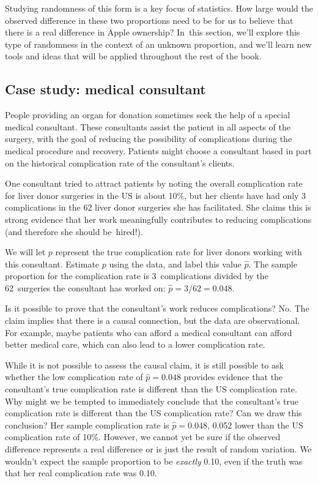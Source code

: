Studying randomness of this form is a key focus of statistics. How large would the observed difference in these two proportions need to be for us to believe that there is a real difference in Apple ownership? In~this section, we'll explore this type of randomness in the context of an unknown proportion, and we'll learn new tools and ideas that will be applied throughout the rest of the book.

\subsection{Case study: medical consultant}

People providing an organ for donation sometimes seek the help of a special medical consultant. These consultants assist the patient in all aspects of the surgery, with the goal of reducing the possibility of complications during the medical procedure and recovery. Patients might choose a consultant based in part on the historical complication rate of the consultant's clients.

One consultant tried to attract patients by noting the overall complication rate for liver donor surgeries in the US is about 10\%, but her clients have had only 3 complications in the 62 liver donor surgeries she has facilitated. She claims this is strong evidence that her work meaningfully contributes to reducing complications (and therefore she should be~hired!).

\begin{example}{We will let $p$ represent the true complication rate for liver donors working with this consultant. Estimate $p$ using the data, and label this value $\hat{p}$.}
The sample proportion for the complication rate is 3~complications divided by the 62~surgeries the consultant has worked on: $\hat{p} = 3/62 = 0.048$.
\end{example}

\begin{example}{Is it possible to prove that the consultant's work reduces complications?}
No. The claim implies that there is a causal connection, but the data are observational. For example, maybe patients who can afford a medical consultant can afford better medical care, which can also lead to a lower complication rate.
\end{example}

\begin{example}{While it is not possible to assess the causal claim, it is still possible to ask whether the low complication rate of $\hat{p} = 0.048$ provides evidence that the consultant's true complication rate is different than the US complication rate. Why might we be tempted to immediately conclude that the consultant's true complication rate is different than the US complication rate? Can we draw this conclusion?}
Her sample complication rate is $\hat{p} = 0.048$, 0.052 lower than the US complication rate of 10\%. However, we cannot yet be sure if the observed difference represents a real difference or is just the result of random variation. We wouldn't expect the sample proportion to be \emph{exactly} 0.10, even if the truth was that her real complication rate was 0.10.
\end{example}


